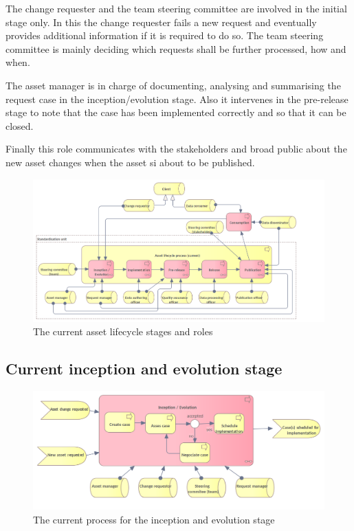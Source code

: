 	
	The change requester and the team steering committee are involved in the initial stage only. In this the change requester fails a new request and eventually provides additional information if it is required to do so. The team steering committee is mainly deciding which requests shall be further processed, how and when. 
	
	The asset manager is in charge of documenting, analysing and summarising the request case in the inception/evolution stage. Also it intervenes in the pre-release stage to note that the case has been implemented correctly and so that it can be closed. 
	
	Finally this role communicates with the stakeholders and broad public about the new asset changes when the asset si about to be published.
	
	
	\begin{figure}[h]
		\centering
		\includegraphics[width=1.05\textwidth]{images/business/Lifecycle (current).png}
		\caption{The current asset lifecycle stages and roles}
		\label{fig:lifecycle-current}
	\end{figure} 
	
	\subsection{Current inception and evolution stage}
	\label{sec:inception-current}
	
	\begin{figure}[h]
		\centering
		\includegraphics[width=.8\textwidth]{images/business/current/InceptionEvolution.png}
		\caption{The current process for the inception and evolution stage}
		\label{fig:evolution-current}
	\end{figure}		
	
